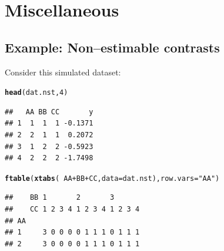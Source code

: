\documentclass[10pt]{article}\usepackage[]{graphicx}\usepackage[]{color}
\makeatletter
\newcommand{\hlnum}[1]{\textcolor[rgb]{0.686,0.059,0.569}{#1}}%
\newcommand{\hlstr}[1]{\textcolor[rgb]{0.192,0.494,0.8}{#1}}%
\newcommand{\hlopt}[1]{\textcolor[rgb]{0,0,0}{#1}}%
\newcommand{\hlstd}[1]{\textcolor[rgb]{0.345,0.345,0.345}{#1}}%
\newcommand{\hlkwc}[1]{\textcolor[rgb]{0.333,0.667,0.333}{#1}}%
\newcommand{\hlkwd}[1]{\textcolor[rgb]{0.737,0.353,0.396}{\textbf{#1}}}%
\newenvironment{kframe}{%
 \def\at@end@of@kframe{}%
 \ifinner\ifhmode%
  \def\at@end@of@kframe{\end{minipage}}%
  \begin{minipage}{\columnwidth}%
 \fi\fi%
 \def\FrameCommand##1{\hskip\@totalleftmargin \hskip-\fboxsep
 \colorbox{shadecolor}{##1}\hskip-\fboxsep
     \hskip-\linewidth \hskip-\@totalleftmargin \hskip\columnwidth}%
 \MakeFramed {\advance\hsize-\width
   \@totalleftmargin\z@ \linewidth\hsize
   \@setminipage}}%
 {\par\unskip\endMakeFramed%
 \at@end@of@kframe}
\newenvironment{knitrout}{}{} %
\def\code#1{\texttt{#1}}
\def\cc#1{\texttt{#1}}
\def\linest{\code{linest()}}
\makeatother
\begin{document}
\section{Miscellaneous}
\label{sec:miscellaneous}



\subsection{Example: Non--estimable contrasts}
\label{sec:exampl-non-estim}




Consider this simulated dataset:
\begin{knitrout}
\color{fgcolor}\begin{kframe}
\begin{alltt}
\hlkwd{head}\hlstd{(dat.nst,} \hlnum{4}\hlstd{)}
\end{alltt}
\begin{verbatim}
##   AA BB CC       y
## 1  1  1  1 -0.1371
## 2  2  1  1  0.2072
## 3  1  2  2 -0.5923
## 4  2  2  2 -1.7498
\end{verbatim}
\begin{alltt}
\hlkwd{ftable}\hlstd{(}\hlkwd{xtabs}\hlstd{(} \hlopt{~} \hlstd{AA} \hlopt{+} \hlstd{BB} \hlopt{+} \hlstd{CC,} \hlkwc{data}\hlstd{=dat.nst),} \hlkwc{row.vars}\hlstd{=}\hlstr{"AA"}\hlstd{)}
\end{alltt}
\begin{verbatim}
##    BB 1       2       3      
##    CC 1 2 3 4 1 2 3 4 1 2 3 4
## AA                           
## 1     3 0 0 0 0 1 1 1 0 1 1 1
## 2     3 0 0 0 0 1 1 1 0 1 1 1
\end{verbatim}
\end{kframe}
\end{knitrout}
\end{document}
